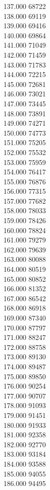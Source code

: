 { 137.000	68722 \\
 138.000	69119 \\
 139.000	69416 \\
 140.000	69864 \\
 141.000	71049 \\
 142.000	71459 \\
 143.000	71783 \\
 144.000	72215 \\
 145.000	72681 \\
 146.000	73021 \\
 147.000	73445 \\
 148.000	73891 \\
 149.000	74271 \\
 150.000	74773 \\
 151.000	75205 \\
 152.000	75532 \\
 153.000	75959 \\
 154.000	76417 \\
 155.000	76876 \\
 156.000	77315 \\
 157.000	77682 \\
 158.000	78033 \\
 159.000	78426 \\
 160.000	78824 \\
 161.000	79279 \\
 162.000	79639 \\
 163.000	80088 \\
 164.000	80519 \\
 165.000	80852 \\
 166.000	81352 \\
 167.000	86542 \\
 168.000	86918 \\
 169.000	87340 \\
 170.000	87797 \\
 171.000	88247 \\
 172.000	88758 \\
 173.000	89130 \\
 174.000	89487 \\
 175.000	89850 \\
 176.000	90254 \\
 177.000	90707 \\
 178.000	91093 \\
 179.000	91451 \\
 180.000	91933 \\
 181.000	92358 \\
 182.000	92770 \\
 183.000	93184 \\
 184.000	93588 \\
 185.000	94055 \\
 186.000	94495 \\
}
